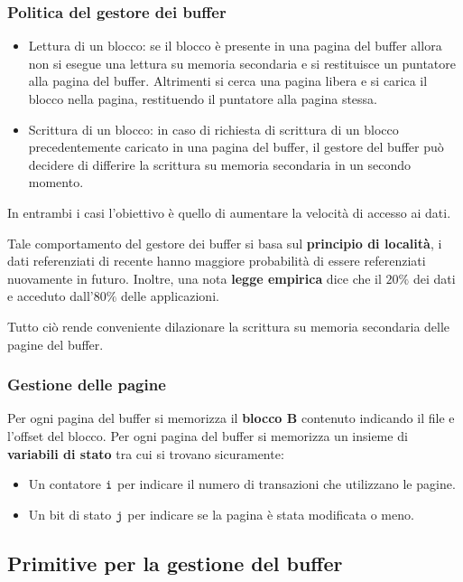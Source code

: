 \documentclass[oneside,a4paper,11pt]{book}
\theoremstyle{italicstyle}
\theoremstyle{normStyle}
\begin{document}
\subsubsection{Politica del gestore dei buffer}
\begin{itemize}
    \item Lettura di un blocco: se il blocco è presente in una pagina del buffer 
    allora non si esegue una lettura su memoria secondaria e si restituisce un puntatore 
    alla pagina del buffer. Altrimenti si cerca una pagina libera e si carica il blocco nella 
    pagina, restituendo il puntatore alla pagina stessa.
    \item Scrittura di un blocco: in caso di richiesta di scrittura 
    di un blocco precedentemente caricato in una pagina del buffer, il gestore del buffer può 
    decidere di differire la scrittura su memoria secondaria in un secondo momento.
\end{itemize}
In entrambi i casi l'obiettivo è quello di aumentare la velocità di 
accesso ai dati.

Tale comportamento del gestore dei buffer si basa sul \textbf{principio di località},
i dati referenziati di recente hanno maggiore probabilità di essere referenziati 
nuovamente in futuro.
Inoltre, una nota \textbf{legge empirica} dice che il $20\%$ dei dati e acceduto 
dall'$80\%$ delle applicazioni. 

Tutto ciò rende conveniente dilazionare la scrittura su memoria secondaria 
delle pagine del buffer.
\subsubsection{Gestione delle pagine}
Per ogni pagina del buffer si memorizza il \textbf{blocco B} contenuto 
indicando il file e l'offset del blocco. Per ogni pagina del buffer si memorizza un insieme di 
\textbf{variabili di stato} tra cui si trovano sicuramente:
\begin{itemize}
    \item Un contatore $\verb|i|$ per indicare il numero di transazioni che utilizzano 
    le pagine.
    \item Un bit di stato $\verb|j|$ per indicare se la pagina è stata modificata o meno.
\end{itemize}
\subsection{Primitive per la gestione del buffer}
\end{document}
